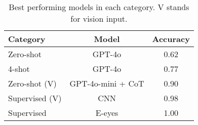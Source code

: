 \begin{table}[tb]
    \centering
    \small
    \begin{tabular}{lcc}
        \toprule
        \textbf{Category} & \textbf{Model} & \textbf{Accuracy} \\
        \midrule
        Zero-shot & GPT-4o & 0.62 \\
        4-shot & GPT-4o & 0.77 \\
        Zero-shot (V) & GPT-4o-mini + CoT & 0.90 \\
        Supervised (V) & CNN & 0.98 \\
        Supervised & E-eyes & 1.00 \\
        \bottomrule
    \end{tabular}
    \caption{Best performing models in each category. V stands for vision input.}
    \label{summary}
\end{table}



